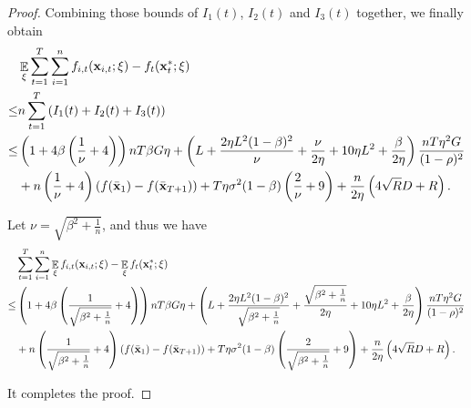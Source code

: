 \documentclass{article}
\begin{document}
\begin{proof}
Combining those bounds of $I_1(t)$, $I_2(t)$ and $I_3(t)$ together, we finally obtain
\begin{align}
\nonumber
& \mathop{\mathbb{E}}_{\xi} \sum_{t=1}^T\sum_{i=1}^n f_{i,t}({\bf x}_{i,t};\xi) - f_t({\bf x}_t^\ast;\xi) \\ \nonumber
\le & n \sum_{t=1}^T \left(  I_1(t) + I_2(t) + I_3(t)  \right) \\ \nonumber
\le & \left( 1 + 4\beta\left( \frac{1}{\nu}+4 \right) \right)nT\beta G \eta + \left(  L + \frac{2\eta L^2(1-\beta)^2}{\nu} + \frac{\nu}{2\eta} + 10\eta L^2  + \frac{\beta}{2\eta}  \right) \frac{nT \eta^2 G}{(1-\rho)^2} \\ \nonumber 
&+ n\left( \frac{1}{\nu} + 4 \right)\left( f(\bar{{\bf x}}_1) - f(\bar{{\bf x}}_{T+1}) \right) + T\eta \sigma^2 (1-\beta)\left( \frac{2}{\nu}+9 \right)   + \frac{n}{2\eta}\left(  4\sqrt{R}D + R   \right).
\end{align} 

Let $\nu = \sqrt{\beta^2 + \frac{1}{n}} $, and thus we have
\begin{align}
\nonumber
&\sum_{t=1}^T\sum_{i=1}^n \mathop{\mathbb{E}}_{\xi} f_{i,t}({\bf x}_{i,t};\xi) - \mathop{\mathbb{E}}_{\xi} f_t({\bf x}_t^\ast;\xi) \\ \nonumber
\le & \left( 1 + 4\beta\left( \frac{1}{\sqrt{\beta^2 + \frac{1}{n}}}+4 \right) \right)nT\beta G \eta + \left(  L + \frac{2\eta L^2(1-\beta)^2}{\sqrt{\beta^2 + \frac{1}{n}}} + \frac{\sqrt{\beta^2 + \frac{1}{n}}}{2\eta} + 10\eta L^2  + \frac{\beta}{2\eta}  \right) \frac{nT \eta^2 G}{(1-\rho)^2} \\ \nonumber 
&+ n\left( \frac{1}{\sqrt{\beta^2 + \frac{1}{n}}} + 4 \right)\left( f(\bar{{\bf x}}_1) - f(\bar{{\bf x}}_{T+1}) \right) + T\eta \sigma^2 (1-\beta)\left( \frac{2}{\sqrt{\beta^2 + \frac{1}{n}}}+9 \right)   + \frac{n}{2\eta}\left(  4\sqrt{R}D + R   \right).
\end{align}





It completes the proof.









\end{proof}
\end{document}
